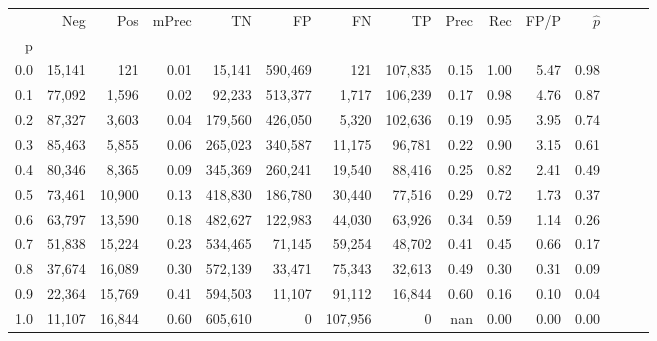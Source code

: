 \begin{tabular}{rrrrrrrrrrrrrrr}
\toprule
{} &     Neg &     Pos & mPrec &       TN &       FP &       FN &       TP &  Prec &   Rec &  FP/P & $\hat{p}$ \\
p   &         &         &       &          &          &          &          &       &       &       &           \\
\midrule
0.0 &  15,141 &     121 &  0.01 &   15,141 &  590,469 &      121 &  107,835 &  0.15 &  1.00 &  5.47 &      0.98 \\
0.1 &  77,092 &   1,596 &  0.02 &   92,233 &  513,377 &    1,717 &  106,239 &  0.17 &  0.98 &  4.76 &      0.87 \\
0.2 &  87,327 &   3,603 &  0.04 &  179,560 &  426,050 &    5,320 &  102,636 &  0.19 &  0.95 &  3.95 &      0.74 \\
0.3 &  85,463 &   5,855 &  0.06 &  265,023 &  340,587 &   11,175 &   96,781 &  0.22 &  0.90 &  3.15 &      0.61 \\
0.4 &  80,346 &   8,365 &  0.09 &  345,369 &  260,241 &   19,540 &   88,416 &  0.25 &  0.82 &  2.41 &      0.49 \\
0.5 &  73,461 &  10,900 &  0.13 &  418,830 &  186,780 &   30,440 &   77,516 &  0.29 &  0.72 &  1.73 &      0.37 \\
0.6 &  63,797 &  13,590 &  0.18 &  482,627 &  122,983 &   44,030 &   63,926 &  0.34 &  0.59 &  1.14 &      0.26 \\
0.7 &  51,838 &  15,224 &  0.23 &  534,465 &   71,145 &   59,254 &   48,702 &  0.41 &  0.45 &  0.66 &      0.17 \\
0.8 &  37,674 &  16,089 &  0.30 &  572,139 &   33,471 &   75,343 &   32,613 &  0.49 &  0.30 &  0.31 &      0.09 \\
0.9 &  22,364 &  15,769 &  0.41 &  594,503 &   11,107 &   91,112 &   16,844 &  0.60 &  0.16 &  0.10 &      0.04 \\
1.0 &  11,107 &  16,844 &  0.60 &  605,610 &        0 &  107,956 &        0 &   nan &  0.00 &  0.00 &      0.00 \\
\bottomrule
\end{tabular}
